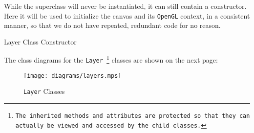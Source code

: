 \documentclass[../../../../../../main.tex]{subfiles}
\begin{document}
While the superclass will never be instantiated, it can still contain a constructor. Here it will be used to initialize the canvas and its \texttt{OpenGL} context, in a consistent manner, so that we do not have repeated, redundant code for no reason.

\begin{algorithm}[H]
\DontPrintSemicolon
\caption{Layer Class Constructor}
\label{alg:layerConstructor}
\end{algorithm}

The class diagrams for the \texttt{Layer
\footnote{The inherited methods and attributes are protected so that they can actually be viewed and accessed by the child classes.}}
 classes are shown on the next page:
\newpage
\begin{figure}[H]
	\centering
	\texttt{[image: diagrams/layers.mps]}
	\caption{\texttt{Layer} Classes}
\end{figure}
\newpage
\end{document}
